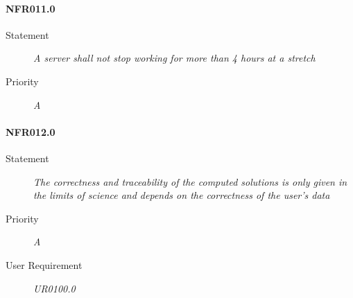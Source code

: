 \paragraph{NFR011.0}
\begin{description}
\item [Statement] \textit{
A server shall not stop working for more than 4 hours at a stretch
}
\item [Priority] \textit{A}
\end{description}

\paragraph{NFR012.0}
\begin{description}
\item [Statement] \textit{
The correctness and traceability of the computed solutions is only given in the limits of science and depends on the correctness of the user's data
}
\item [Priority] \textit{A}
\item[User Requirement] \textit{UR0100.0}
\end{description}

